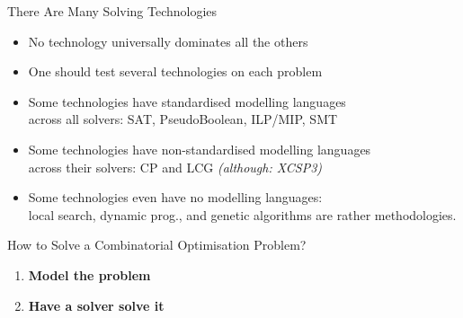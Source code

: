 \documentclass{cons-beamer}
\begin{document}
\begin{frame}{There Are Many Solving Technologies}
  \begin{itemize}
  \item No technology universally dominates all the others \vfill
  \item One should test several technologies on each problem \vfill
  \item Some technologies have \alert{standardised} modelling languages \\ 
        across all solvers: SAT, PseudoBoolean, ILP/MIP, SMT \vfill
  \item Some technologies have \alert{non-standardised} modelling languages \\ 
        across their solvers: CP and LCG \textit{(although: XCSP3)} \vfill
    
  \item Some technologies even have \alert{no} modelling languages: \\ 
        local search, dynamic prog., and genetic algorithms are rather methodologies. \vfill
  \end{itemize}
\end{frame}

\begin{frame}{How to Solve a Combinatorial Optimisation Problem?}
  \begin{enumerate}
  \item \textbf{Model the problem}
     \vfill
    
  \item \textbf{Have a solver solve it}
  \end{enumerate} \vfill
  
\end{frame}
\end{document}
